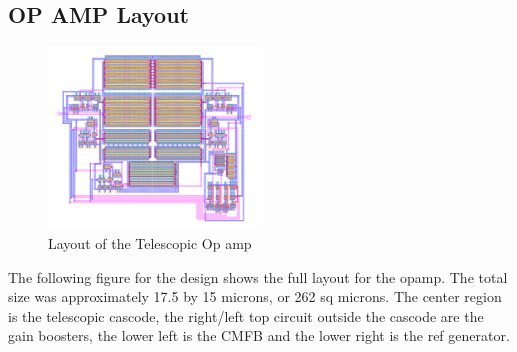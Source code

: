 \documentclass[conference]{IEEEtran}
\begin{document}
\subsection{OP AMP Layout}
\FloatBarrier
\begin{figure}[htb]
\centering
\includegraphics[width=0.5\textwidth]{op_amp_layout.png}
\caption{Layout of the Telescopic Op amp}
\label{folded}
\end{figure}
\FloatBarrier
 The following figure for the design shows the full layout for the opamp. The total size was approximately 17.5 by 15 microns, or 262 sq microns. The center region is the telescopic cascode, the right/left top circuit outside the cascode are the gain boosters, the lower left is the CMFB and the lower right is the ref generator.
\end{document}
